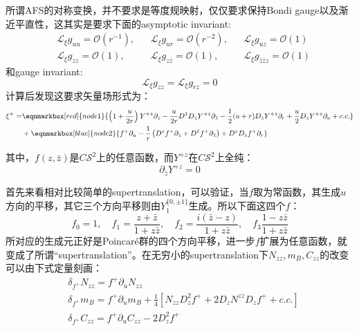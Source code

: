 所谓AFS的对称变换，并不要求是等度规映射，仅仅要求保持Bondi gauge以及渐近平直性，这其实是要求下面的asymptotic invariant:
\begin{align*}
	&\mathcal{L}_\xi g_{uu}=\mathcal{O}(r^{-1}),&&\mathcal{L}_\xi g_{ur}=\mathcal{O}(r^{-2}),&&\mathcal{L}_\xi g_{uz}=\mathcal{O}(1)\\
	&\mathcal{L}_\xi g_{zz}=\mathcal{O}(1),&&\mathcal{L}_\xi g_{z\bar z}=\mathcal{O}(1),&&\mathcal{L}_\xi g_{\bar z \bar zz}=\mathcal{O}(1)
\end{align*}
和gauge invariant:
\begin{equation}
	\mathcal{L}_\xi g_{zz}=\mathcal{L}_\xi g_{rz}=0
\end{equation}
计算后发现这要求矢量场形式为：
\begin{equation}
	\begin{aligned}
		\xi^+=&\eqnmarkbox[red]{node1}{\left(1+\frac{u}{2r}\right)Y^{+z}\partial_z-\frac{u}{2r}D^{\bar z}D_zY^{+z}\partial_{\bar z}-\frac{1}{2}(u+r)D_zY^{+z}\partial_r+\frac{u}{2}D_zY^{+z}\partial_u+c.c.}\\
		&+\eqnmarkbox[blue]{node2}{f^+\partial_u-\frac{1}{r}\left(D^zf^+\partial_z+D^{\bar z}f^+\partial_{\bar z}\right)+D^zD_zf^+\partial_r}
	\end{aligned}
\end{equation}

\noindent 其中，$f(z,\bar z)$是$C\mathcal{S}^2$上的任意函数，而$Y^{+z}$在$C\mathcal{S}^2$上全纯：
\begin{equation}\label{Y}
	\partial_{\bar z}Y^{+z}=0
\end{equation}

首先来看相对比较简单的supertranslation，可以验证，当$f$取为常函数，其生成$u$方向的平移，其它三个方向平移则由$Y_1^{\{0,\pm1\}}$生成。所以下面这四个$f$：
\begin{equation}\label{f}
	f_0=1,\quad f_1=\frac{z+\bar z}{1+z\bar z},\quad f_2=\frac{i\left(\bar z-z\right)}{1+z\bar z},\quad f_3\frac{1-z\bar z}{1+z\bar z}
\end{equation}
所对应的生成元正好是Poincar\'e群的四个方向平移，进一步$f$扩展为任意函数，就变成了所谓“supertranslation”。在无穷小的supertranslation下$N_{zz},m_B,C_{zz}$的改变可以由下式定量刻画：
\begin{equation}
	\begin{aligned}
		&\delta_{f^+}N_{zz}=f^+\partial_u N_{zz}\\
		&\delta_{f^+} m_B=f^+\partial_u m_B+\frac{1}{4}\left[N_{zz}D_z^2f^++2D_zN^{zz}D_zf^++c.c.\right]\\
		&\delta_{f^+} C_{zz}=f^+\partial_u C_{zz}-2D_z^2f^+
	\end{aligned}
\end{equation}

